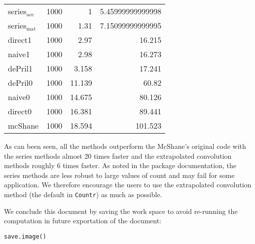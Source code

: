 \documentclass[a4paper,twoside,11pt]{article}
\begin{document}
\begin{center}
\begin{tabular}{lrrr}
series\(_{\text{acc}}\) & 1000 & 1 & 5.45999999999998\\
series\(_{\text{mat}}\) & 1000 & 1.31 & 7.15099999999995\\
direct1 & 1000 & 2.97 & 16.215\\
naive1 & 1000 & 2.98 & 16.273\\
dePril1 & 1000 & 3.158 & 17.241\\
dePril0 & 1000 & 11.139 & 60.82\\
naive0 & 1000 & 14.675 & 80.126\\
direct0 & 1000 & 16.381 & 89.441\\
mcShane & 1000 & 18.594 & 101.523\\
\end{tabular}
\end{center}

As can been seen, all the methods outperform the McShane's original code with
the series methods almost 20 times faster and the extrapolated convolution
methods roughly 6 times faster. As noted in the package documentation, the
series methods are less robust to large values of count and may fail for some
application. We therefore encourage the users to use the extrapolated
convolution method (the default in \texttt{Countr}) as much as possible.  

\label{sec:org0c77e0b}
We conclude this document by saving the work space to avoid re-running the
computation in future exportation of the document:
\begin{verbatim}
save.image()
\end{verbatim}




\label{sec:org3af36d9}


\end{document}
